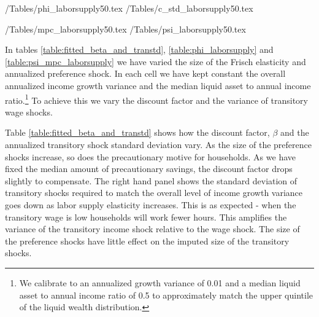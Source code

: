 \documentclass[titlepage]{\econtex}\newcommand{\texname}{ConsumptionHeterogeneity}
\begin{document}
\begin{center}
	\econtexRoot/Tables/phi_laborsupply50.tex	
	\econtexRoot/Tables/c_std_laborsupply50.tex		
	\label{table:phi_laborsupply}
\end{center}

\begin{center}
	\econtexRoot/Tables/mpc_laborsupply50.tex
	\econtexRoot/Tables/psi_laborsupply50.tex		
	\label{table:psi_mpc_laborsupply}
\end{center}

In tables \ref{table:fitted_beta_and_transtd}, \ref{table:phi_laborsupply} and \ref{table:psi_mpc_laborsupply} we have varied the size of the Frisch elasticity and annualized preference shock. In each cell we have kept constant the overall annualized income growth variance and the median liquid asset to annual income ratio.\footnote{We calibrate to an annualized growth variance of 0.01 and a median liquid asset to annual income ratio of 0.5 to approximately match the upper quintile of the liquid wealth distribution.} To achieve this we vary the discount factor and the variance of transitory wage shocks.

Table \ref{table:fitted_beta_and_transtd} shows how the discount factor, $\beta$ and the annualized transitory shock standard deviation vary. As the size of the preference shocks increase, so does the precautionary motive for households. As we have fixed the median amount of precautionary savings, the discount factor drops slightly to compensate. The right hand panel shows the standard deviation of transitory shocks required to match the overall level of income growth variance goes down as labor supply elasticity increases. This is as expected - when the transitory wage is low households will work fewer hours. This amplifies the variance of the transitory income shock relative to the wage shock. The size of the preference shocks have little effect on the imputed size of the transitory shocks.
\end{document}
